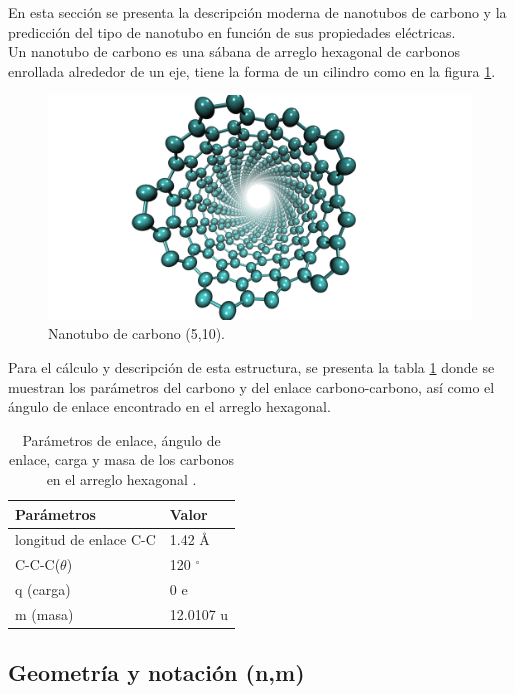 En esta sección se presenta la descripción moderna de nanotubos de carbono y la predicción del tipo de nanotubo en función de sus propiedades eléctricas.\\

Un nanotubo de carbono es una sábana de arreglo hexagonal de carbonos enrollada alrededor de un eje, tiene la forma de un cilindro como en la figura \ref{fig:CNTejemplo}.\\

\begin{figure}[!h]
    \centering
    \includegraphics[width=.5\textwidth,keepaspectratio=true]{CNT/CNTejemplo.png}
    \caption{Nanotubo de carbono (5,10).}
    \label{fig:CNTejemplo}
\end{figure}

Para el cálculo y descripción de esta estructura, se presenta la tabla \ref{tab:carbono} donde se muestran los parámetros del carbono y del enlace carbono-carbono, así como el ángulo de enlace encontrado en el arreglo hexagonal.

\begin{table}[h!]
    \centering
    \begin{tabular}{ |p{4cm}|p{2cm}|  }
    \hline
    Parámetros  & Valor \\
    \hline
    longitud de enlace C-C   & 1.42 \AA \\
    \hline
    C-C-C($\theta$)   & 120 $^{\circ}$ \\
    \hline
    q (carga) & 0 e \\
    \hline
    m (masa)   & 12.0107 u \\
    \hline
    \end{tabular}
    \caption{Parámetros de enlace, ángulo de enlace, carga y masa de los carbonos en el arreglo hexagonal \cite{Melendez2016}.}
    \label{tab:carbono}
\end{table}

\newpage

\subsection{Geometría y notación (n,m)}

